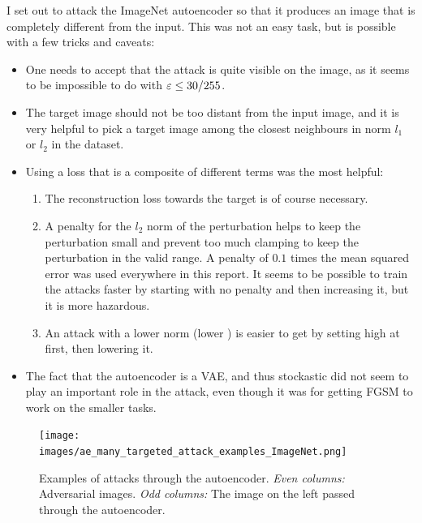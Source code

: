 \documentclass[]{scrarticle}
\begin{document}
I set out to attack the ImageNet autoencoder
so that it produces an image that is completely different from the input.
This was not an easy task, but is possible with a few tricks and caveats:
\begin{itemize}
  \item One needs to accept that the attack is quite visible on the image,
    as it seems to be impossible to do with $\varepsilon \leq 30 / 255$.
  \item The target image should not be too distant from the input image,
    and it is very helpful to pick a target image among the closest neighbours
    in norm $l_1$ or $l_2$ in the dataset.
  \item Using a loss that is a composite of different terms was the most helpful:
    \begin{enumerate}
      \item The reconstruction loss towards the target is of course necessary.
      \item A penalty for the $l_2$ norm of the perturbation helps to keep the
        perturbation small and prevent too much clamping to keep the perturbation
        in the valid range. A penalty of $0.1$ times the mean squared error was used
        everywhere in this report. It seems to be possible to train the attacks faster by
        starting with no penalty and then increasing it, but it is more hazardous.
      \item An attack with a lower norm (lower \e) is easier to get by setting \e high at first,
        then lowering it.
    \end{enumerate}
  \item The fact that the autoencoder is a VAE, and thus stockastic did not seem to
    play an important role in the attack, even though it was for getting FGSM to work on
    the smaller tasks.
\end{itemize}

\begin{figure}[h]
  \centering
  \texttt{[image: images/ae\_many\_targeted\_attack\_examples\_ImageNet.png]}
  \caption{
    Examples of attacks through the autoencoder.
    \emph{Even columns:} Adversarial images.
    \emph{Odd columns:} The image on the left passed through the autoencoder.
  }
  \label{fig:ae_targeted_attack_example2}
\end{figure}
\end{document}
